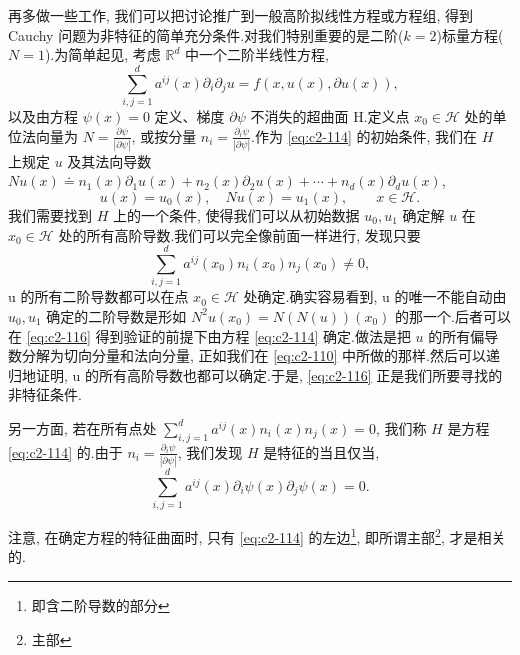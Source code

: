 再多做一些工作, 我们可以把讨论推广到一般高阶拟线性方程或方程组, 得到 Cauchy 问题为非特征的简单充分条件.对我们特别重要的是二阶($k = 2$)标量方程($N = 1$).为简单起见, 考虑 $\mathbb{R}^{d}$ 中一个二阶半线性方程,
\begin{equation}
\sum_{i, j = 1}^{d} a^{ij}(x) \partial_{i} \partial_{j} u = f(x, u(x), \partial u(x)), \label{eq:c2-114}
\end{equation}
以及由方程 $\psi(x) = 0$ 定义、梯度 $\partial \psi$ 不消失的超曲面 H.定义点 $x_{0} \in \mathcal{H}$ 处的单位法向量为 $N = \frac{\partial \psi}{|\partial \psi|}$, 或按分量 $n_{i} = \frac{\partial_{i} \psi}{|\partial \psi|}$.作为 \eqref{eq:c2-114} 的初始条件, 我们在 $H$ 上规定 $u$ 及其法向导数 $N u(x) \doteq n_{1}(x) \partial_{1} u(x) + n_{2}(x) \partial_{2} u(x) + \cdots + n_{d}(x) \partial_{d} u(x)$,
\begin{equation}
u(x) = u_{0}(x), \quad N u(x) = u_{1}(x), \qquad x \in \mathcal{H}. \label{eq:c2-115}
\end{equation}
我们需要找到 $H$ 上的一个条件, 使得我们可以从初始数据 $u_{0}, u_{1}$ 确定解 $u$ 在 $x_{0} \in \mathcal{H}$ 处的所有高阶导数.我们可以完全像前面一样进行, 发现只要
\begin{equation}
\sum_{i, j = 1}^{d} a^{ij}(x_{0}) n_{i}(x_{0}) n_{j}(x_{0}) \neq 0, \label{eq:c2-116}
\end{equation}
u 的所有二阶导数都可以在点 $x_{0} \in \mathcal{H}$ 处确定.确实容易看到, u 的唯一不能自动由 $u_{0}, u_{1}$ 确定的二阶导数是形如 $N^{2} u(x_{0}) = N(N(u))(x_{0})$ 的那一个.后者可以在 \eqref{eq:c2-116} 得到验证的前提下由方程 \eqref{eq:c2-114} 确定.做法是把 $u$ 的所有偏导数分解为切向分量和法向分量, 正如我们在 \eqref{eq:c2-110} 中所做的那样.然后可以递归地证明, u 的所有高阶导数也都可以确定.于是, \eqref{eq:c2-116} 正是我们所要寻找的非特征条件.

另一方面, 若在所有点处 $\sum_{i, j = 1}^{d} a^{ij}(x) n_{i}(x) n_{j}(x) = 0$, 我们称 $H$ 是方程 \eqref{eq:c2-114} 的.由于 $n_{i} = \frac{\partial_{i} \psi}{|\partial \psi|}$, 我们发现 $H$ 是特征的当且仅当,
\begin{equation}
\sum_{i, j = 1}^{d} a^{ij}(x) \partial_{i} \psi(x) \partial_{j} \psi(x) = 0. \label{eq:c2-117}
\end{equation}

\begin{remark*}
注意, 在确定方程的特征曲面时, 只有 \eqref{eq:c2-114} 的左边\footnote{即含二阶导数的部分}, 即所谓主部\footnote{主部}, 才是相关的.
\end{remark*}

